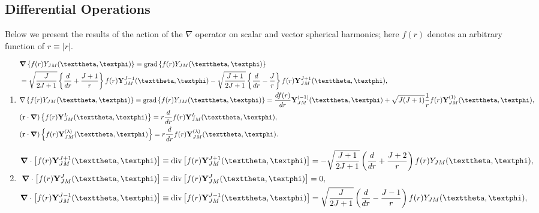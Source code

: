 \subsection{Differential Operations}\label{sec:7.3.6}
Below we present the results of the action of the $\nabla$ operator on scalar and vector spherical harmonics; here $f(r)$ denotes an arbitrary function of $r \equiv|r|$.\\
\begin{enumerate}[label=(\alph*)]
\item 
\begin{align}
& \boldsymbol{\nabla}\left\{f(r) Y_{J M}(\vartheta, \varphi)\right\} \equiv \grad \left\{f(r) Y_{J M}(\vartheta, \varphi)\right\}  \notag\\
& =\sqrt{\frac{J}{2 J+1}}\left\{\frac{d}{d r}+\frac{J+1}{r}\right\} f(r) \vect{Y}_{J M}^{J-1}(\vartheta, \varphi)-\sqrt{\frac{J+1}{2 J+1}}\left\{\frac{d}{d r}-\frac{J}{r}\right\} f(r) \vect{Y}_{J M}^{J+1}(\vartheta, \varphi), \label{eq:7:3:51}\\
& \nabla\left\{f(r) Y_{J M}(\vartheta, \varphi)\right\} \equiv \grad \left\{f(r) Y_{J M}(\vartheta, \varphi)\right\}=\frac{d f(r)}{d r} \vect{Y}_{J M}^{(-1)}(\vartheta, \varphi)+\sqrt{J(J+1)} \frac{1}{r} f(r) \vect{Y}_{J M}^{(1)}(\vartheta, \varphi), \notag\\
& (\vect{r}\cdot \boldsymbol{\nabla})\left\{f(r) \vect{Y}_{J M}^{L}(\vartheta, \varphi)\right\}=r \frac{d}{d r} f(r) \vect{Y}_{J M}^{L}(\vartheta, \varphi), \label{eq:7:3:52}\\
& (\vect{r}\cdot \boldsymbol{\nabla})\left\{f(r) \vect{Y}_{J M}^{(\lambda)}(\vartheta, \varphi)\right\}=r \frac{d}{d r} f(r) \vect{Y}_{J M}^{(\lambda)}(\vartheta, \varphi). \notag
\end{align}
\item 
\begin{align}
\boldsymbol{\nabla} \cdot\left[f(r) \vect{Y}_{J M}^{J+1}(\vartheta, \varphi)\right] &\equiv \diver \left[f(r) \vect{Y}_{J M}^{J+1}(\vartheta, \varphi)\right]=-\sqrt{\frac{J+1}{2 J+1}}\left(\frac{d}{d r}+\frac{J+2}{r}\right) f(r) Y_{J M}(\vartheta, \varphi), \notag\\
\boldsymbol{\nabla} \cdot\left[f(r) \vect{Y}_{J M}^{J}(\vartheta, \varphi)\right] &\equiv \diver \left[f(r) \vect{Y}_{J M}^{J}(\vartheta, \varphi)\right]=0, \label{eq:7:3:53}\\
\boldsymbol{\nabla} \cdot\left[f(r) \vect{Y}_{J M}^{J-1}(\vartheta, \varphi)\right] &\equiv \diver \left[f(r) \vect{Y}_{J M}^{J-1}(\vartheta, \varphi)\right]=\sqrt{\frac{J}{2 J+1}}\left(\frac{d}{d r}-\frac{J-1}{r}\right) f(r) Y_{J M}(\vartheta, \varphi), \notag

\end{align}
\end{enumerate}
